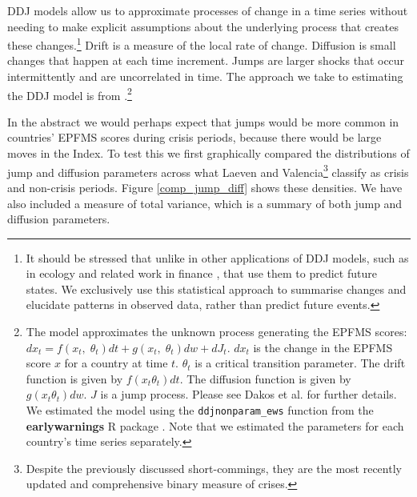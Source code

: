 \documentclass[]{article}
\begin{document}
DDJ models allow us to approximate processes of change in a time series without needing to make explicit assumptions about the underlying process that creates these changes.\footnote{It should be stressed that unlike in other applications of DDJ models, such as in ecology and related work in finance \citep{Kou2008}, that use them to predict future states. We exclusively use this statistical approach to summarise changes and elucidate patterns in observed data, rather than predict future events.} Drift is a measure of the local rate of change. Diffusion is small changes that happen at each time increment. Jumps are larger shocks that occur intermittently and are uncorrelated in time. The approach we take to estimating the DDJ model is from \cite{Carpenter2011}.\footnote{The model approximates the unknown process generating the EPFMS scores: $dx_{t} = f(x_{t},\;\theta_{t})dt + g(x_{t},\;\theta_{t})dw + dJ_{t}$. $dx_{t}$ is the change in the EPFMS score $x$ for a country at time $t$. $\theta_{t}$ is a critical transition parameter. The drift function is given by $f(x_{t}\theta_{t})dt$. The diffusion function is given by $g(x_{t}\theta_{t})dw$. $J$ is a jump process. Please see Dakos et al. \citeyearpar[7]{Dakos2012} for further details. We estimated the model using the \texttt{ddjnonparam\_ews} function from the \textbf{earlywarnings} R package \citep{earlywarnings2013}. Note that we estimated the parameters for each country's time series separately.}

In the abstract we would perhaps expect that jumps would be more common in countries' EPFMS scores during crisis periods, because there would be large moves in the Index. To test this we first graphically compared the distributions of jump and diffusion parameters across what Laeven and Valencia\footnote{Despite the previously discussed short-commings, they are the most recently updated and comprehensive binary measure of crises.} classify as crisis and non-crisis periods. Figure \ref{comp_jump_diff} shows these densities. We have also included a measure of total variance, which is a summary of both jump and diffusion parameters.
\end{document}
